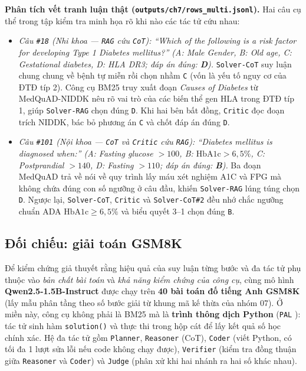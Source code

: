 \textbf{Phân tích vết tranh luận thật (\texttt{outputs/ch7/rows\_multi.jsonl}).} Hai câu cụ thể trong tập kiểm tra minh họa rõ khi nào các tác tử cứu nhau:
\begin{itemize}
  \item \emph{Câu \texttt{\#18} (Nhi khoa — \texttt{RAG} cứu \texttt{CoT}): ``Which of the following is a risk factor for developing Type 1 Diabetes mellitus?'' (A: Male Gender, B: Old age, C: Gestational diabetes, D: HLA DR3; đáp án đúng: \textbf{D}).} \texttt{Solver-CoT} suy luận chung chung về bệnh tự miễn rồi chọn nhầm \texttt{C} (vốn là yếu tố nguy cơ của ĐTĐ típ 2). Công cụ BM25 truy xuất đoạn \emph{Causes of Diabetes} từ MedQuAD-NIDDK nêu rõ vai trò của các biến thể gen HLA trong ĐTĐ típ 1, giúp \texttt{Solver-RAG} chọn đúng \texttt{D}. Khi hai bên bất đồng, \texttt{Critic} đọc đoạn trích NIDDK, bác bỏ phương án \texttt{C} và chốt đáp án đúng \texttt{D}.
  \item \emph{Câu \texttt{\#101} (Nội khoa — \texttt{CoT} và \texttt{Critic} cứu \texttt{RAG}): ``Diabetes mellitus is diagnosed when:'' (A: Fasting glucose $>100$, B: $\text{HbA1c}>6{,}5\%$, C: Postprandial $>140$, D: Fasting $>110$; đáp án đúng: \textbf{B}).} Ba đoạn MedQuAD trả về nói về quy trình lấy máu xét nghiệm A1C và FPG mà không chứa đúng con số ngưỡng ở câu đầu, khiến \texttt{Solver-RAG} lúng túng chọn \texttt{D}. Ngược lại, \texttt{Solver-CoT}, \texttt{Critic} và \texttt{Solver-CoT\#2} đều nhớ chắc ngưỡng chuẩn ADA $\text{HbA1c}\ge 6{,}5\%$ và biểu quyết 3–1 chọn đúng \texttt{B}.
\end{itemize}

\subsection{Đối chiếu: giải toán GSM8K}

Để kiểm chứng giả thuyết rằng hiệu quả của suy luận từng bước và đa tác tử phụ thuộc vào \emph{bản chất bài toán} và \emph{khả năng kiểm chứng của công cụ}, cùng mô hình \textbf{Qwen2.5-1.5B-Instruct} được chạy trên \textbf{40 bài toán đố tiếng Anh GSM8K} \cite{cobbe2021gsm8k} (lấy mẫu phân tầng theo số bước giải từ khung mã kế thừa của nhóm 07). Ở miền này, công cụ không phải là BM25 mà là \textbf{trình thông dịch Python} (\texttt{PAL} \cite{gao2023pal}): tác tử sinh hàm \texttt{solution()} và thực thi trong hộp cát để lấy kết quả số học chính xác. Hệ đa tác tử gồm \texttt{Planner}, \texttt{Reasoner} (CoT), \texttt{Coder} (viết Python, có tối đa 1 lượt sửa lỗi nếu code không chạy được), \texttt{Verifier} (kiểm tra đồng thuận giữa \texttt{Reasoner} và \texttt{Coder}) và \texttt{Judge} (phân xử khi hai nhánh ra hai số khác nhau).

